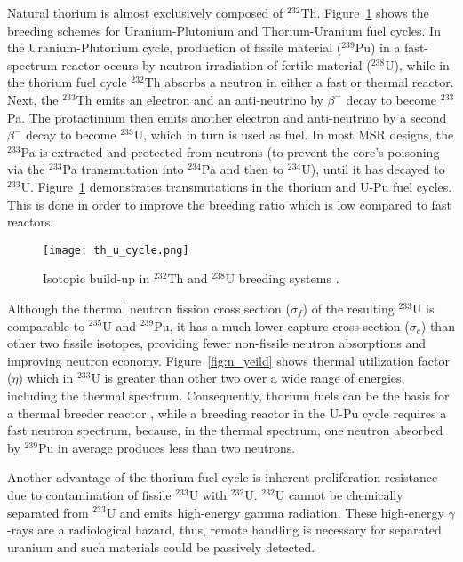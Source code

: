 Natural thorium is almost exclusively composed of $^{232}$Th. Figure~\ref{fig:th_cycle} shows the breeding schemes for Uranium-Plutonium and Thorium-Uranium fuel cycles. In the Uranium-Plutonium cycle, production of fissile material ($^{239}$Pu) in a fast-spectrum reactor occurs by neutron irradiation of fertile material ($^{238}$U), while in the thorium fuel cycle $^{232}$Th absorbs a neutron in either a fast or thermal reactor. Next, the $^{233}$Th emits an electron and an anti-neutrino by $\beta^-$ decay to become $^{233}$Pa. The protactinium then emits another electron and anti-neutrino by a second $\beta^-$ decay to become $^{233}$U, which in turn is used as fuel. In most \gls{MSR} designs, the $^{233}$Pa is extracted and protected from neutrons (to prevent the core's poisoning via the $^{233}$Pa transmutation into $^{234}$Pa and then to $^{234}$U), until it has decayed to $^{233}$U. Figure~\ref{fig:th_cycle} demonstrates transmutations in the thorium and U-Pu fuel cycles. This is done in order to improve the breeding ratio which is low compared to fast reactors. 

\begin{figure}[t] %
  \centering
  \vspace{-0.3em}
  \texttt{[image: th\_u\_cycle.png]}
  \caption{Isotopic build-up in $^{232}$Th and $^{238}$U breeding systems \cite{eschbach_possible_1966}.}
  \vspace{-1.1em}
  \label{fig:th_cycle}
\end{figure}
\FloatBarrier

Although the thermal neutron fission cross section ($\sigma_f$) of the resulting $^{233}$U is comparable to $^{235}$U and $^{239}$Pu, it has a much lower capture cross section ($\sigma_c$) than other two fissile isotopes, providing fewer non-fissile neutron absorptions and improving neutron economy. Figure~\ref{fig:n_yeild} shows thermal utilization factor ($\eta$) which in $^{233}$U is greater than other two over a wide range of energies, including the thermal spectrum. Consequently, thorium fuels can be the basis for a thermal breeder reactor \cite{iaea_thorium_2005}, while a breeding reactor in the U-Pu cycle requires a fast neutron spectrum, because, in the thermal spectrum, one neutron absorbed by $^{239}$Pu in average produces less than two neutrons.

Another advantage of the thorium fuel cycle is inherent proliferation resistance due to contamination of fissile $^{233}$U with $^{232}$U. $^{232}$U cannot be chemically separated from $^{233}$U and  emits high-energy gamma radiation. These high-energy $\gamma$-rays are a radiological hazard, thus, remote handling is necessary for separated uranium and such materials could be passively detected.

